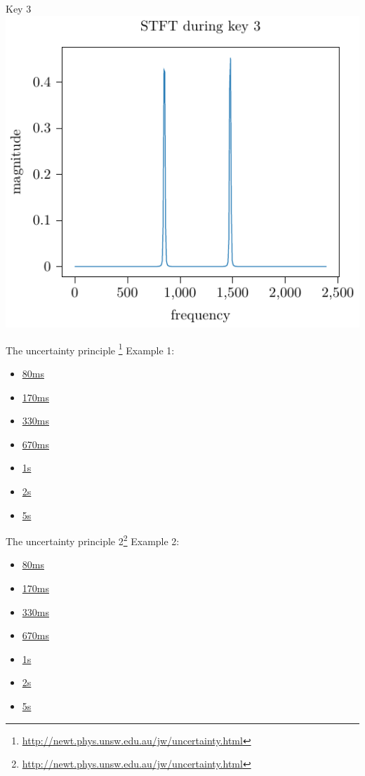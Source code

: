 \documentclass[xcolor=dvipsnames]{beamer}
\begin{document}
\begin{frame}{Key 3}
\centering
\includegraphics[width=0.5\linewidth]{./plots/stft_key_3.pdf}
\end{frame}

\begin{frame}{The uncertainty principle \footnote{\url{http://newt.phys.unsw.edu.au/jw/uncertainty.html}}}
Example 1:
\begin{itemize}
\item \href{run:./sounds/heisenberg/400+403-80ms.wav}{80ms}
\item \href{run:./sounds/heisenberg/400+403-170ms.wav}{170ms}
\item \href{run:./sounds/heisenberg/400+403-330ms.wav}{330ms}
\item \href{run:./sounds/heisenberg/400+403-670ms.wav}{670ms}
\item \href{run:./sounds/heisenberg/400+403-1s.wav}{1s}
\item \href{run:./sounds/heisenberg/400+403-2s.wav}{2s}
\item \href{run:./sounds/heisenberg/400+403-5s.wav}{5s}
\end{itemize}
\end{frame}

\begin{frame}{The uncertainty principle 2\footnote{\url{http://newt.phys.unsw.edu.au/jw/uncertainty.html}}}
Example 2:
\begin{itemize}
\item \href{run:./sounds/heisenberg/400+401-80ms.wav}{80ms}
\item \href{run:./sounds/heisenberg/400+401-170ms.wav}{170ms}
\item \href{run:./sounds/heisenberg/400+401-330ms.wav}{330ms}
\item \href{run:./sounds/heisenberg/400+401-670ms.wav}{670ms}
\item \href{run:./sounds/heisenberg/400+401-1s.wav}{1s}
\item \href{run:./sounds/heisenberg/400+401-2s.wav}{2s}
\item \href{run:./sounds/heisenberg/400+401-5s.wav}{5s}
\end{itemize}
\end{frame}
\end{document}
